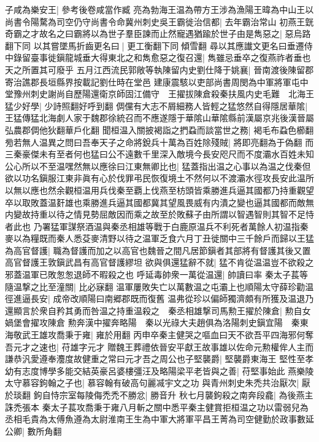 子咸為樂安王|{
	參考後卷咸當作臧}
亮為勃海王温為帶方王涉為漁陽王暐為中山王以尚書令陽騖為司空仍守尚書令命冀州刺史吳王霸徙治信都|{
	去年霸治常山}
初燕王皝奇霸之才故名之曰霸將以為世子羣臣諫而止然寵遇猶踰於世子由是雋惡之|{
	惡烏路翻下同}
以其嘗墜馬折齒更名曰|{
	更工衡翻下同傾雪翻}
尋以其應䜟文更名曰垂遷侍中錄留臺事徙鎭龍城垂大得東北之和雋愈惡之復召還|{
	雋雖忌垂卒之復燕祚者垂也天之所置其可廢乎}
五月江西流民郭敞等執陳留内史劉仕降于姚襄|{
	晉南渡後陳留郡寄治譙郡長垣縣界按載記劉仕時在堂邑}
建康震駭以吏部尚書周閔為中軍將軍屯中堂豫州刺史謝尚自歷陽還衛京師固江備守　王擢拔陳倉殺秦扶風内史毛難　北海王猛少好學|{
	少詩照翻好呼到翻}
倜儻有大志不屑細務人皆輕之猛悠然自得隱居華隂|{
	王猛傳猛北海劇人家于魏郡徐統召而不應遂隱于華隂山華隂縣前漢屬京兆後漢晉屬弘農郡倜他狄翻華戶化翻}
聞桓温入關披褐詣之捫蝨而談當世之務|{
	褐毛布蝨色櫛翻}
㫄若無人温異之問曰吾奉天子之命將銳兵十萬為百姓除殘賊|{
	將即亮翻為于偽翻}
而三秦豪傑未有至者何也猛曰公不遠數千里深入敵境今長安咫尺而不度灞水百姓未知公心所以不至温嘿然無以應徐曰江東無卿比也|{
	猛蓋指出温之心事以為温之伐秦但欲以功名鎭服江東非眞有心於伐罪弔民恢復境土不然何以不渡灞水徑攻長安此温所以無以應也然余觀桓温用兵伐秦至覇上伐燕至枋頭皆乘勝進兵逼其國都乃持重觀望卒以取敗蓋温姧雄也乘勝進兵逼其國都冀其望風畏威有内潰之變也逼其國都而敵無内變故持重以待之情見勢屈敵因而乘之故至於敗蘇子由所謂以智遇智則其智不足恃者此也}
乃署猛軍謀祭酒温與秦丞相雄等戰于白鹿原温兵不利死者萬餘人初温指秦麥以為糧既而秦人悉芟麥清野以待之温軍乏食六月丁丑徙關中三千餘戶而歸以王猛為高官督護|{
	職為督護而加之以高官也魏晉之間凡居節鎭者其部將有督護其後又置高官督護王敦鎭武昌有高官督護繆坦}
欲與俱還猛辭不就|{
	猛不肯從温温豈不欲殺之邪蓋温軍已敗怱怱退師不暇殺之也}
呼延毒帥衆一萬從温還|{
	帥讀曰率}
秦太子萇等隨温撃之比至潼關|{
	比必寐翻}
温軍屢敗失亡以萬數温之屯灞上也順陽太守薛珍勸温徑進逼長安|{
	成帝改順陽曰南郷郡既而復舊}
温弗從珍以偏師獨濟頗有所獲及温退乃還顯言於衆自矜其勇而咎温之持重温殺之　秦丞相雄撃司馬勲王擢於陳倉|{
	勲自女媧堡會擢攻陳倉}
勲奔漢中擢奔略陽　秦以光祿大夫趙俱為洛陽刺史鎭宜陽　秦東海敬武王雄攻喬秉于雍|{
	雍於用翻}
丙申卒秦主健哭之嘔血曰天不欲吾平四海邪何奪吾元才之速也|{
	苻雄字元才}
贈魏王葬禮依晉安平獻王故事雄以佐命元勲權侔人主而謙恭汎愛遵奉灋度故健重之常曰元才吾之周公也子堅襲爵|{
	堅襲爵東海王}
堅性至孝幼有志度博學多能交結英豪呂婆樓彊汪及略陽梁平老皆與之善|{
	苻堅事始此}
燕樂陵太守慕容鉤翰之子也|{
	慕容翰有破高句麗㓕宇文之功}
與青州刺史朱禿共治厭次|{
	厭於琰翻}
鉤自恃宗室每陵侮禿禿不勝忿|{
	勝音升}
秋七月襲鉤殺之南奔段龕|{
	為後燕主誅禿張本}
秦太子萇攻喬秉于雍八月斬之關中悉平秦主健賞拒桓温之功以雷弱兒為丞相毛貴為太傅魚遵為太尉淮南王生為中軍大將軍平昌王菁為司空健勤於政事數延公卿|{
	數所角翻}
